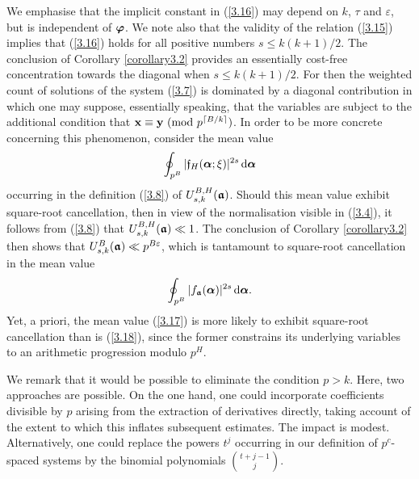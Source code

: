 \documentclass[12pt,reqno]{amsart}
\theoremstyle{definition}
\theoremstyle{remark}
\numberwithin{equation}{section}
\newcommand{\mmod}[1]{\,\,(\text{\rm mod}\,\,#1)}
\def\bfx{{\mathbf x}}
\def\bfy{{\mathbf y}}
\def\grf{{\mathfrak f}}\def\grF{{\mathfrak F}}
\def\eps{\varepsilon}
\def\le{\leqslant} \def\ge{\geqslant} \def\pleq{\preccurlyeq} \def\ple{\prec}
\def\d{{\,{\rm d}}}
\begin{document}
We emphasise that the implicit constant in (\ref{3.16}) may depend on $k$, $\tau$ and 
$\eps$, but is independent of ${\boldsymbol \varphi}$. We note also that the validity of the relation 
(\ref{3.15}) implies that (\ref{3.16}) holds for all positive numbers $s\le k(k+1)/2$. The 
conclusion of Corollary \ref{corollary3.2} provides an essentially cost-free concentration 
towards the diagonal when $s\le k(k+1)/2$. For then the weighted count of solutions of the 
system (\ref{3.7}) is dominated by a diagonal contribution in which one may suppose, 
essentially speaking, that the variables are subject to the additional condition that 
$\bfx\equiv \bfy\mmod{p^{\lceil B/k\rceil}}$. In order to be more concrete concerning this 
phenomenon, consider the mean value
\begin{equation}\label{3.17}
\oint_{p^B}|\grf_H(\bfalp;\xi)|^{2s}\d\bfalp 
\end{equation}
occurring in the definition (\ref{3.8}) of $U_{s,k}^{B,H}({\boldsymbol {{\mathfrak a}}})$. Should this mean value 
exhibit square-root cancellation, then in view of the normalisation visible in (\ref{3.4}), it 
follows from (\ref{3.8}) that $U_{s,k}^{B,H}({\boldsymbol {{\mathfrak a}}})\ll 1$. The conclusion of Corollary 
\ref{corollary3.2} then shows that $U_{s,k}^B(\bfgra)\ll p^{B\eps}$, which is tantamount 
to square-root cancellation in the mean value
\begin{equation}\label{3.18}
\oint_{p^B}|f_\bfgra(\bfalp)|^{2s}\d\bfalp .
\end{equation}
Yet, a priori, the mean value (\ref{3.17}) is more likely to exhibit square-root cancellation 
than is (\ref{3.18}), since the former constrains its underlying variables to an arithmetic 
progression modulo $p^H$.\par

We remark that it would be possible to eliminate the condition $p>k$. Here, two 
approaches are possible. On the one hand, one could incorporate coefficients divisible by 
$p$ arising from the extraction of derivatives directly, taking account of the extent to which 
this inflates subsequent estimates. The impact is modest. Alternatively, one could replace 
the powers $t^j$ occurring in our definition of $p^c$-spaced systems by the binomial 
polynomials $\binom{t+j-1}{j}$.
\end{document}
